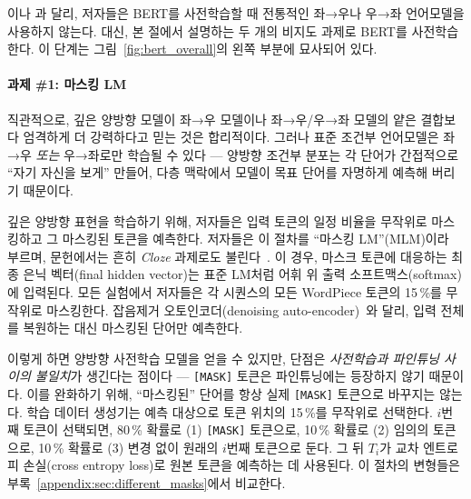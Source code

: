 \citet{peters-etal:2018:_deep}이나 \citet{radford-etal:2018}과 달리, 저자들은 BERT를 사전학습할 때 전통적인 좌→우나 우→좌 언어모델을 사용하지 않는다. 대신, 본 절에서 설명하는 두 개의 비지도 과제로 BERT를 사전학습한다. 이 단계는 그림~\ref{fig:bert_overall}의 왼쪽 부분에 묘사되어 있다.

\paragraph{과제 \#1: 마스킹 LM}
직관적으로, 깊은 양방향 모델이 좌→우 모델이나 좌→우/우→좌 모델의 얕은 결합보다 엄격하게 더 강력하다고 믿는 것은 합리적이다. 그러나 표준 조건부 언어모델은 좌→우 \emph{또는} 우→좌로만 학습될 수 있다 — 양방향 조건부 분포는 각 단어가 간접적으로 ``자기 자신을 보게'' 만들어, 다층 맥락에서 모델이 목표 단어를 자명하게 예측해 버리기 때문이다.

깊은 양방향 표현을 학습하기 위해, 저자들은 입력 토큰의 일정 비율을 무작위로 마스킹하고 그 마스킹된 토큰을 예측한다. 저자들은 이 절차를 ``마스킹 LM''(MLM)이라 부르며, 문헌에서는 흔히 \emph{Cloze} 과제로도 불린다~\cite{taylor:1953:_cloze}. 이 경우, 마스크 토큰에 대응하는 최종 은닉 벡터(final hidden vector)는 표준 LM처럼 어휘 위 출력 소프트맥스(softmax)에 입력된다. 모든 실험에서 저자들은 각 시퀀스의 모든 WordPiece 토큰의 15\,\%를 무작위로 마스킹한다. 잡음제거 오토인코더(denoising auto-encoder)~\cite{vincent:2008}와 달리, 입력 전체를 복원하는 대신 마스킹된 단어만 예측한다.

이렇게 하면 양방향 사전학습 모델을 얻을 수 있지만, 단점은 \emph{사전학습과 파인튜닝 사이의 불일치}가 생긴다는 점이다 — {\tt [MASK]} 토큰은 파인튜닝에는 등장하지 않기 때문이다. 이를 완화하기 위해, ``마스킹된'' 단어를 항상 실제 {\tt [MASK]} 토큰으로 바꾸지는 않는다. 학습 데이터 생성기는 예측 대상으로 토큰 위치의 15\,\%를 무작위로 선택한다. $i$번째 토큰이 선택되면, 80\,\% 확률로 (1) {\tt [MASK]} 토큰으로, 10\,\% 확률로 (2) 임의의 토큰으로, 10\,\% 확률로 (3) 변경 없이 원래의 $i$번째 토큰으로 둔다. 그 뒤 $T_i$가 교차 엔트로피 손실(cross entropy loss)로 원본 토큰을 예측하는 데 사용된다.
이 절차의 변형들은 부록~\ref{appendix:sec:different_masks}에서 비교한다.
\vspace{.2cm}

